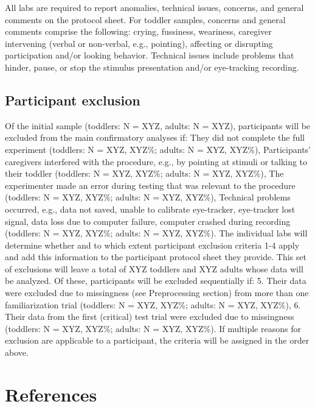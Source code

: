 \documentclass[
  english,
  man, donotrepeattitle,floatsintext]{apa6}
\begin{document}
All labs are required to report anomalies, technical issues, concerns, and general comments on the protocol sheet. For toddler samples, concerns and general comments comprise the following: crying, fussiness, weariness, caregiver intervening (verbal or non-verbal, e.g., pointing), affecting or disrupting participation and/or looking behavior. Technical issues include problems that hinder, pause, or stop the stimulus presentation and/or eye-tracking recording.

\hypertarget{participant-exclusion}{%
\subsection{Participant exclusion}\label{participant-exclusion}}

Of the initial sample (toddlers: N = XYZ, adults: N = XYZ), participants will be excluded from the main confirmatory analyses if:
They did not complete the full experiment (toddlers: N = XYZ, XYZ\%; adults: N = XYZ, XYZ\%),
Participants' caregivers interfered with the procedure, e.g., by pointing at stimuli or talking to their toddler (toddlers: N = XYZ, XYZ\%; adults: N = XYZ, XYZ\%),
The experimenter made an error during testing that was relevant to the procedure (toddlers: N = XYZ, XYZ\%; adults: N = XYZ, XYZ\%),
Technical problems occurred, e.g., data not saved, unable to calibrate eye-tracker, eye-tracker lost signal, data loss due to computer failure, computer crashed during recording (toddlers: N = XYZ, XYZ\%; adults: N = XYZ, XYZ\%).
The individual labs will determine whether and to which extent participant exclusion criteria 1-4 apply and add this information to the participant protocol sheet they provide. This set of exclusions will leave a total of XYZ toddlers and XYZ adults whose data will be analyzed. Of these, participants will be excluded sequentially if:
5. Their data were excluded due to missingness (see Preprocessing section) from more than one familiarization trial (toddlers: N = XYZ, XYZ\%; adults: N = XYZ, XYZ\%),
6. Their data from the first (critical) test trial were excluded due to missingness (toddlers: N = XYZ, XYZ\%; adults: N = XYZ, XYZ\%).
If multiple reasons for exclusion are applicable to a participant, the criteria will be assigned in the order above.

\newpage

\hypertarget{references}{%
\section{References}\label{references}}
\end{document}
